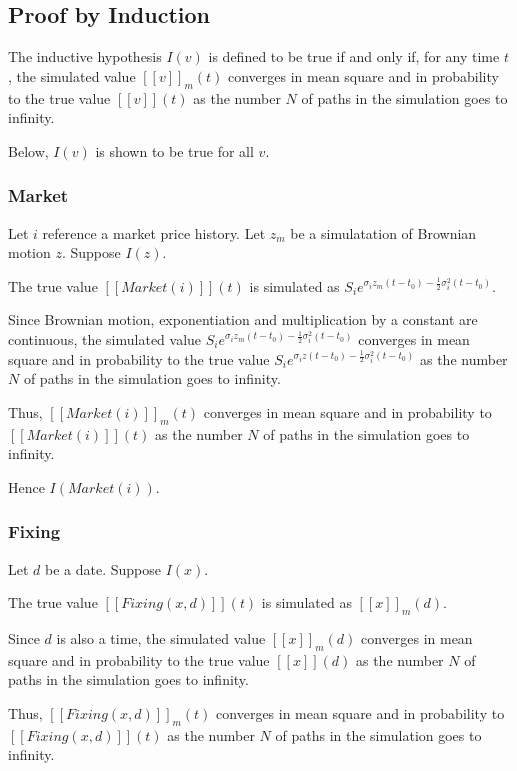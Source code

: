 \documentclass[a4paper,11pt]{article}
\newcommand{\sembrack}[1]{[\![#1]\!]}
\begin{document}
\subsection{Proof by Induction}
The inductive hypothesis $I(v)$ is defined to be true if and only if, for any time $t$, the simulated value $\sembrack{v}_m(t)$ converges in mean square and in probability to the true value $\sembrack{v}(t)$ as the number $N$ of paths in the simulation goes to infinity.

Below, $I(v)$ is shown to be true for all $v$.


\subsubsection{Market}

Let $i$ reference a market price history. Let $z_m$ be a simulatation of Brownian motion $z$. Suppose $I(z)$.

The true value $\sembrack{Market(i)}(t)$ is simulated as $S_i e^{\sigma_i z_m(t - t_0) - \frac{1}{2} \sigma_i^2 (t - t_0) }$.

Since Brownian motion, exponentiation and multiplication by a constant are continuous, the simulated value $S_i e^{\sigma_i z_m(t - t_0) - \frac{1}{2} \sigma_i^2 (t - t_0) }$ converges in mean square and in probability to the true value $S_i e^{\sigma_i z(t - t_0) - \frac{1}{2} \sigma_i^2 (t - t_0) }$ as the number $N$ of paths in the simulation goes to infinity.

Thus, $\sembrack{Market(i)}_m(t)$ converges in mean square and in probability to $\sembrack{Market(i)}(t)$ as the number $N$ of paths in the simulation goes to infinity.

Hence $I(Market(i))$.

\subsubsection{Fixing}
Let $d$ be a date. Suppose $I(x)$.

The true value $\sembrack{Fixing(x, d)}(t)$ is simulated as $ \sembrack{x}_m(d) $.

Since $d$ is also a time, the simulated value $ \sembrack{x}_m(d) $ converges in mean square and in probability to the true value $ \sembrack{x}(d) $ as the number $N$ of paths in the simulation goes to infinity.

Thus, $\sembrack{Fixing(x, d)}_m(t)$ converges in mean square and in probability to $\sembrack{Fixing(x, d)}(t)$ as the number $N$ of paths in the simulation goes to infinity.
\end{document}
